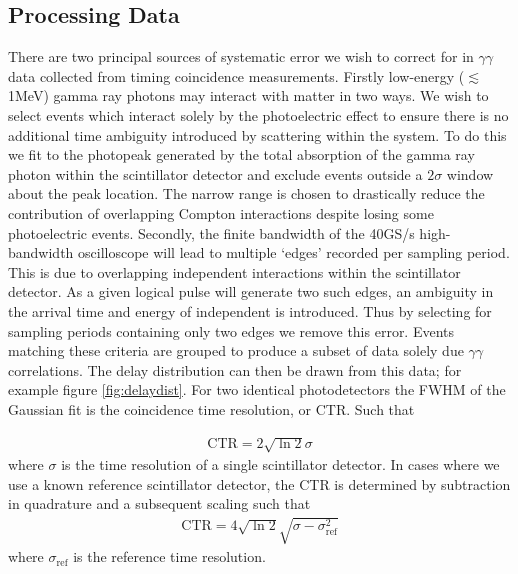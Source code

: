 \subsection{Processing Data}
There are two principal sources of systematic error we wish to correct for in $\gamma\gamma$ data collected from timing coincidence measurements. Firstly low-energy ($\lesssim$1MeV) gamma ray photons may interact with matter in two ways. We wish to select events which interact solely by the photoelectric effect to ensure there is no additional time ambiguity introduced by scattering within the system. To do this we fit to the photopeak generated by the total absorption of the gamma ray photon within the scintillator detector and exclude events outside a $2\sigma$ window about the peak location. The narrow range is chosen to drastically reduce the contribution of overlapping Compton interactions despite losing some photoelectric events. Secondly, the finite bandwidth of the 40GS/s high-bandwidth oscilloscope will lead to multiple `edges' recorded per sampling period. This is due to overlapping independent interactions within the scintillator detector. As a given logical pulse will generate two such edges, an ambiguity in the arrival time and energy of independent is introduced. Thus by selecting for sampling periods containing only two edges we remove this error. Events matching these criteria are grouped to produce a subset of data solely due $\gamma\gamma$ correlations. The delay distribution can then be drawn from this data; for example figure \ref{fig:delaydist}. For two identical photodetectors the FWHM of the Gaussian fit is the coincidence time resolution, or CTR. Such that

\begin{align}
\text{CTR} = 2\sqrt{\ln{2}}\sigma
\end{align}
where $\sigma$ is the time resolution of a single scintillator detector. In cases where we use a known reference scintillator detector, the CTR is determined by subtraction in quadrature and a subsequent scaling such that
\begin{align}
\text{CTR} = 4\sqrt{\ln{2}}\sqrt{\sigma-\sigma_\textrm{ref}^2}
\end{align}
where $\sigma_\text{ref}$ is the reference time resolution.